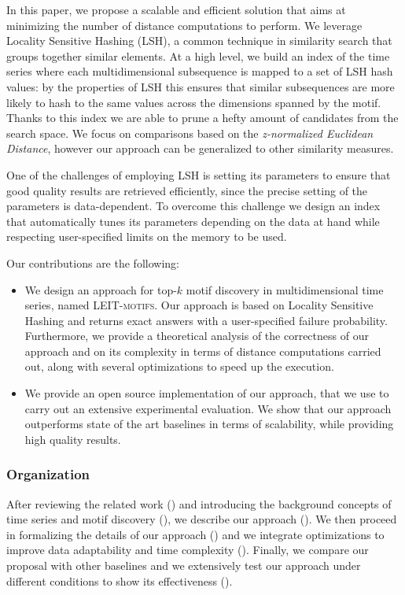 In this paper, we propose a scalable and efficient solution that aims at minimizing the number of distance computations to perform.
We leverage Locality Sensitive Hashing (LSH), a common technique in similarity search that groups together similar elements.
At a high level, we build an index of the time series where each multidimensional subsequence is mapped to a set of LSH hash values: by the properties of LSH this ensures that similar subsequences are more likely to hash to the same values across the dimensions spanned by the motif.
Thanks to this index we are able to prune a hefty amount of candidates from the search space.
We focus on comparisons based on the \textit{z-normalized Euclidean Distance}, however our approach can be generalized to other similarity measures.

One of the challenges of employing LSH is setting its parameters to ensure that good quality results are retrieved efficiently, since the precise setting of the parameters is data-dependent.
To overcome this challenge we design an index that automatically tunes its parameters depending on the data at hand while respecting user-specified limits on the memory to be used.

Our contributions are the following:
\begin{itemize}
    \item
        We design an approach for top-$k$ motif discovery in multidimensional time series,
        named \textsc{LEIT-motifs}.
        Our approach is based on Locality Sensitive Hashing and returns exact answers with a user-specified failure probability.
        Furthermore, we provide a theoretical analysis of the correctness of our approach and on its complexity in terms of distance computations carried out, along with several optimizations to speed up the execution.
    \item 
        We provide an open source implementation of our approach, that we use to carry out an extensive experimental evaluation.
        We show that our approach outperforms state of the art baselines in terms of scalability,
        while providing high quality results.
\end{itemize}

\subsubsection*{Organization}
After reviewing the related work () and introducing the background concepts of time series and motif discovery (), we describe our approach (). We then proceed in formalizing the details of our approach () and we integrate optimizations to improve data adaptability and time complexity (). Finally, we compare our proposal with other baselines and we extensively test our approach under different conditions to show its effectiveness ().
